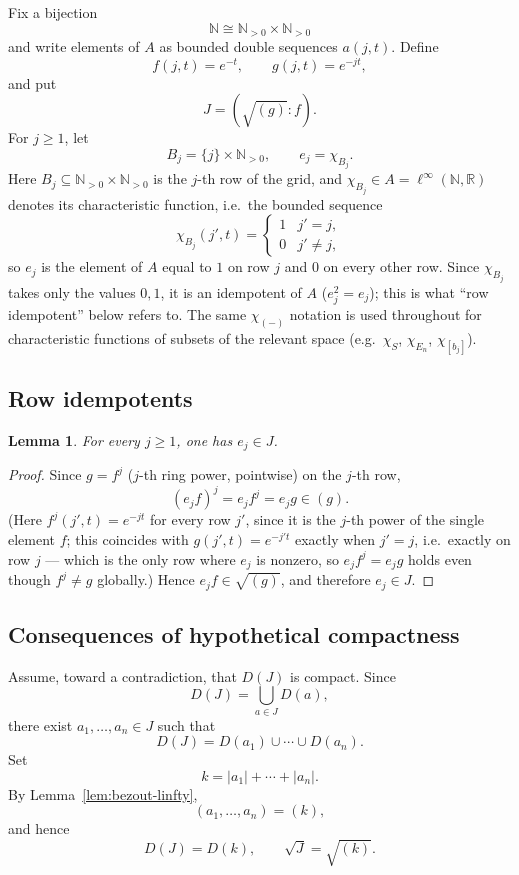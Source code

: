 \documentclass{amsart}
\newtheorem{lemma}[theorem]{Lemma}
\theoremstyle{definition}
\theoremstyle{remark}
\newcommand{\nat}{\mathbb N}
\newcommand{\reals}{\mathbb R}
\newcommand{\linfty}{\ell^\infty}
\begin{document}
Fix a bijection
\[
\nat\cong\nat_{>0}\times\nat_{>0}
\]
and write elements of $A$ as bounded double sequences $a(j,t)$.
Define
\[
f(j,t)=e^{-t},
\qquad
g(j,t)=e^{-jt},
\]
and put
\[
J=(\sqrt{(g)}:f).
\]
For $j\geq1$, let
\[
B_j=\{j\}\times\nat_{>0},
\qquad
e_j=\chi_{B_j}.
\]
Here $B_j\subseteq\nat_{>0}\times\nat_{>0}$ is the $j$-th row of the grid, and
$\chi_{B_j}\in A=\linfty(\nat,\reals)$ denotes its characteristic
function, i.e.\ the bounded sequence
\[
\chi_{B_j}(j',t)=
\begin{cases}
1 & j'=j,\\
0 & j'\neq j,
\end{cases}
\]
so $e_j$ is the element of $A$ equal to $1$ on row $j$ and $0$ on every
other row. Since $\chi_{B_j}$ takes only the values $0,1$, it is an
idempotent of $A$ ($e_j^2=e_j$); this is what ``row idempotent'' below
refers to. The same $\chi_{(-)}$ notation is used throughout for
characteristic functions of subsets of the relevant space (e.g.\
$\chi_S$, $\chi_{E_n}$, $\chi_{[b_j]}$).

\subsection{Row idempotents}

\begin{lemma}\label{lem:row-idempotents}
For every $j\geq1$, one has $e_j\in J$.
\end{lemma}

\begin{proof}
Since $g=f^j$ ($j$-th ring power, pointwise) on the $j$-th row,
\[
(e_jf)^j=e_jf^j=e_jg\in(g).
\]
(Here $f^j(j',t)=e^{-jt}$ for every row $j'$, since it is the $j$-th
power of the single element $f$; this coincides with $g(j',t)=e^{-j't}$
exactly when $j'=j$, i.e.\ exactly on row $j$ --- which is the only row
where $e_j$ is nonzero, so $e_jf^j=e_jg$ holds even though $f^j\neq g$
globally.)
Hence $e_jf\in\sqrt{(g)}$, and therefore $e_j\in J$.
\end{proof}

\subsection{Consequences of hypothetical compactness}

Assume, toward a contradiction, that $D(J)$ is compact. Since
\[
D(J)=\bigcup_{a\in J}D(a),
\]
there exist $a_1,\dots,a_n\in J$ such that
\[
D(J)=D(a_1)\cup\cdots\cup D(a_n).
\]
Set
\[
k=|a_1|+\cdots+|a_n|.
\]
By Lemma~\ref{lem:bezout-linfty},
\[
(a_1,\dots,a_n)=(k),
\]
and hence
\begin{equation}\label{eq:radical-k}
D(J)=D(k),
\qquad
\sqrt J=\sqrt{(k)}.
\end{equation}
\end{document}
